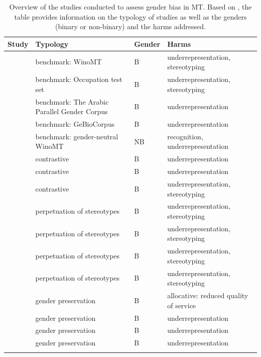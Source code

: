 \begin{table}
        \caption[Studies assessing gender bias in MT -- Overview]{Overview of the studies conducted to assess gender bias in MT. Based on \textcite{savoldi2021gender}, the table provides information on the typology of studies as well as the genders (binary or non-binary) and the harms addressed.}
    \label{tab:genderassessment}
    {\begin{tabularx}{\textwidth}{QQlQ}
    \lsptoprule
        \textbf{Study} & \textbf{Typology} & \textbf{Gender} & \textbf{Harms}  \\
        \midrule
        \textcite{stanovsky2019evaluating} & benchmark: WinoMT & B & underrepresentation, stereotyping \\
        \textcite{font2019equalizing} & benchmark: Occupation test set & B & underrepresentation, stereotyping \\
        \textcite{habash-etal-2019-automatic} & benchmark: The Arabic Parallel Gender Corpus & B & underrepresentation \\
        \textcite{costa-jussa-etal-2020-gebiotoolkit} & benchmark: GeBioCorpus & B & underrepresentation \\
        \textcite{saunders2020neural} & benchmark: gender-neutral WinoMT & NB & recognition, underrepresentation \\
        \textcite{frank2004gender} & contrastive & B & underrepresentation \\
        \textcite{abu2017errors} & contrastive & B & underrepresentation \\
        \textcite{rescigno2020gender} & contrastive & B & underrepresentation, stereotyping \\
        \textcite{prates2019assessing} & perpetuation of stereotypes & B & underrepresentation, stereotyping \\
        \textcite{cho2019measuring} & perpetuation of stereotypes & B & underrepresentation, stereotyping \\
        \textcite{stanovsky2019evaluating} & perpetuation of stereotypes & B & underrepresentation, stereotyping \\
        \textcite{gonen-webster-2020-automatically} & perpetuation of stereotypes & B & underrepresentation, stereotyping \\
        \textcite{vanmassenhove2019getting} & gender preservation & B & allocative: reduced quality of service \\
        \textcite{hovy2020you} & gender preservation & B & underrepresentation \\
        \textcite{vanmassenhove-etal-2021-neutral} & gender preservation & B & underrepresentation \\
        \textcite{currey-etal-2022-mt} & gender preservation & B & underrepresentation \\
        \lspbottomrule
    \end{tabularx}}
\end{table}

